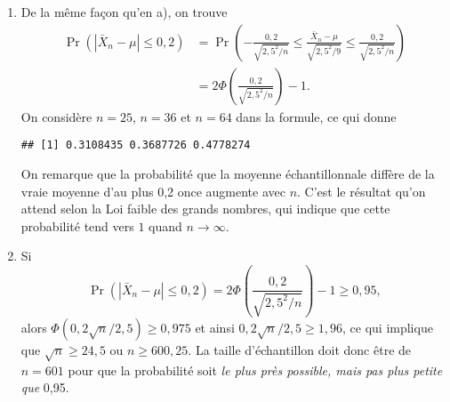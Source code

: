\begin{solution}{2.22}
\begin{enumerate}
\item De la même façon qu'en a), on trouve
\begin{align*}
\Pr(|\bar X_n - \mu| \le 0,2)& =\Pr\left(-\frac{0,2}{\sqrt{2,5^2/n}} \le \frac{\bar X_n - \mu}{\sqrt{2,5^2/9}} \le \frac{0,2}{\sqrt{2,5^2/n}} \right)\\
& = 2\Phi\left(\frac{0,2}{\sqrt{2,5^2/n}}\right)-1.
\end{align*}
On considère $n=25$, $n=36$ et $n=64$ dans la formule, ce qui donne
\begin{knitrout}
\color{fgcolor}\begin{kframe}
\begin{alltt}
 \hlkwb{<-} \hlstd{(}\hlstd{,}\hlstd{,}\hlstd{)}
\hlopt{*}\hlstd{(}\hlopt{/}\hlstd{(}\hlopt{^}\hlopt{/}\hlopt{-}
\end{alltt}
\begin{verbatim}
## [1] 0.3108435 0.3687726 0.4778274
\end{verbatim}
\end{kframe}
\end{knitrout}
On remarque que la probabilité que la moyenne échantillonnale diffère de la vraie moyenne d'au plus 0,2 once augmente avec $n$. C'est le résultat qu'on attend selon la Loi faible des grands nombres, qui indique que cette probabilité tend vers $1$ quand $n\to \infty$.

\item Si
$$
\Pr ( | {\bar X}_n - \mu | \le 0,2) = 2\Phi\left(\frac{0,2}{\sqrt{2,5^2/n}}\right)-1 \geq 0,95,
$$
alors
$\Phi \left(0,2\sqrt{n}/2,5\right) \geq 0,975$ et ainsi $0,2\sqrt{n}/2,5 \geq 1,96$, ce qui implique que $\sqrt{n} \geq 24,5$ ou $n\geq 600,25$. La taille d'échantillon doit donc être de $n=601$ pour que la probabilité soit \emph{le plus près possible, mais pas plus petite que} 0,95.


\end{enumerate}
\end{solution}

